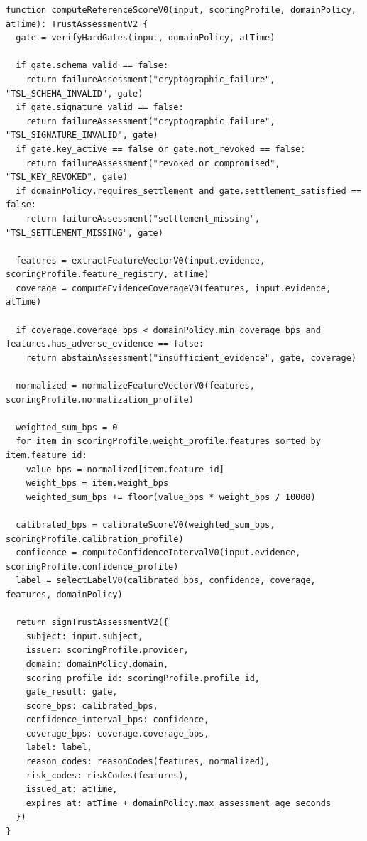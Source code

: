 \documentclass[11pt]{article}
\begin{document}
\begin{lstlisting}[style=tslcode]
function computeReferenceScoreV0(input, scoringProfile, domainPolicy, atTime): TrustAssessmentV2 {
  gate = verifyHardGates(input, domainPolicy, atTime)

  if gate.schema_valid == false:
    return failureAssessment("cryptographic_failure", "TSL_SCHEMA_INVALID", gate)
  if gate.signature_valid == false:
    return failureAssessment("cryptographic_failure", "TSL_SIGNATURE_INVALID", gate)
  if gate.key_active == false or gate.not_revoked == false:
    return failureAssessment("revoked_or_compromised", "TSL_KEY_REVOKED", gate)
  if domainPolicy.requires_settlement and gate.settlement_satisfied == false:
    return failureAssessment("settlement_missing", "TSL_SETTLEMENT_MISSING", gate)

  features = extractFeatureVectorV0(input.evidence, scoringProfile.feature_registry, atTime)
  coverage = computeEvidenceCoverageV0(features, input.evidence, atTime)

  if coverage.coverage_bps < domainPolicy.min_coverage_bps and features.has_adverse_evidence == false:
    return abstainAssessment("insufficient_evidence", gate, coverage)

  normalized = normalizeFeatureVectorV0(features, scoringProfile.normalization_profile)

  weighted_sum_bps = 0
  for item in scoringProfile.weight_profile.features sorted by item.feature_id:
    value_bps = normalized[item.feature_id]
    weight_bps = item.weight_bps
    weighted_sum_bps += floor(value_bps * weight_bps / 10000)

  calibrated_bps = calibrateScoreV0(weighted_sum_bps, scoringProfile.calibration_profile)
  confidence = computeConfidenceIntervalV0(input.evidence, scoringProfile.confidence_profile)
  label = selectLabelV0(calibrated_bps, confidence, coverage, features, domainPolicy)

  return signTrustAssessmentV2({
    subject: input.subject,
    issuer: scoringProfile.provider,
    domain: domainPolicy.domain,
    scoring_profile_id: scoringProfile.profile_id,
    gate_result: gate,
    score_bps: calibrated_bps,
    confidence_interval_bps: confidence,
    coverage_bps: coverage.coverage_bps,
    label: label,
    reason_codes: reasonCodes(features, normalized),
    risk_codes: riskCodes(features),
    issued_at: atTime,
    expires_at: atTime + domainPolicy.max_assessment_age_seconds
  })
}
\end{lstlisting}
\end{document}
